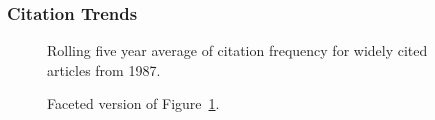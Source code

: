 \documentclass[
  10pt,
  letterpaper,
  DIV=11,
  numbers=noendperiod,
  twoside]{scrartcl}
\begin{document}
\subsubsection*{Citation Trends}\label{sec-trends-1987}

\begin{figure}


\caption{\label{fig-citation-spaghetti-1987}Rolling five year average of
citation frequency for widely cited articles from 1987.}

\end{figure}%

\begin{figure}


\caption{\label{fig-citation-facet-1987}Faceted version of
Figure~\ref{fig-citation-spaghetti-1987}.}

\end{figure}%
\end{document}
